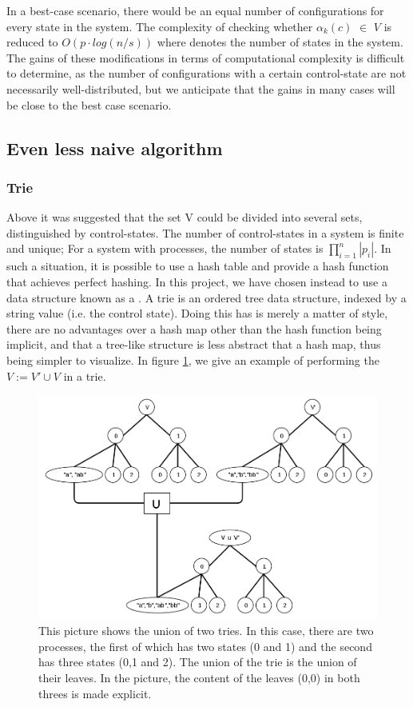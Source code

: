 In a best-case scenario, there would be an equal number of configurations for every state in the system. The complexity of checking whether $\alpha_k(c)$ $\in$ $V$ is reduced to $O(p \cdot log (n/s))$ where  denotes the number of states in the system. The gains of these modifications in terms of computational complexity is difficult to determine, as the number of configurations with a certain control-state are not necessarily well-distributed, but we anticipate that the gains in many cases will be close to the best case scenario.



\subsection{Even less naive algorithm}
\subsubsection{Trie}
Above it was suggested that the set V could be divided into several sets, distinguished by control-states. The number of control-states in a system is finite and unique; For a system with  processes, the number of states is $\prod\limits_{i=1}^n|p_i|$. In such a situation, it is possible to use a hash table and provide a hash function that achieves perfect hashing. In this project, we have chosen instead to use a data structure known as a . A trie is an ordered tree data structure, indexed by a string value (i.e. the control state). Doing this has is merely a matter of style, there are no advantages over a hash map other than the hash function being implicit, and that a tree-like structure is less abstract that a hash map, thus being simpler to visualize. In figure \ref{triemerge}, we give an example of performing the $V := V' \cup V$ in a trie.

\begin{figure}
\includegraphics[width=400pt] {bilder/triemerge.png}
\caption{This picture shows the union of two tries. In this case, there are two processes, the first of which has two states (0 and 1) and the second has three states (0,1 and 2). The union of the trie is the union of their leaves. In the picture, the content of the leaves (0,0) in both threes is made explicit.}
\label{triemerge}
\end{figure}


